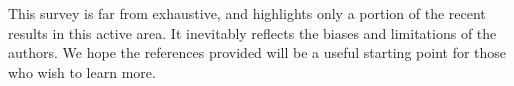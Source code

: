 \documentclass{amsart}
\theoremstyle{definition}
\begin{document}
\medskip

This survey is far from exhaustive, and highlights only a portion of the recent results in this active area.  It inevitably reflects the biases and limitations of the authors. We hope the references provided will be a useful starting point for those who wish to learn more. 








\end{document}
